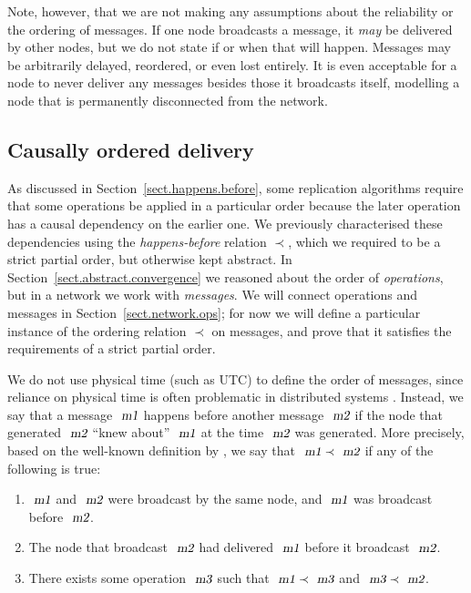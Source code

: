 Note, however, that we are not making any assumptions about the reliability or the ordering of messages.
If one node broadcasts a message, it \emph{may} be delivered by other nodes, but we do not state if or when that will happen.
Messages may be arbitrarily delayed, reordered, or even lost entirely.
It is even acceptable for a node to never deliver any messages besides those it broadcasts itself, modelling a node that is permanently disconnected from the network.

\subsection{Causally ordered delivery}

As discussed in Section~\ref{sect.happens.before}, some replication algorithms require that some operations be applied in a particular order because the later operation has a causal dependency on the earlier one.
We previously characterised these dependencies using the \emph{happens-before} relation $\prec$, which we required to be a strict partial order, but otherwise kept abstract.
In Section~\ref{sect.abstract.convergence} we reasoned about the order of \emph{operations}, but in a network we work with \emph{messages}.
We will connect operations and messages in Section~\ref{sect.network.ops}; for now we will define a particular instance of the ordering relation $\prec$ on messages, and prove that it satisfies the requirements of a strict partial order.

We do not use physical time (such as UTC) to define the order of messages, since reliance on physical time is often problematic in distributed systems \cite{Sheehy:2015jm}.
Instead, we say that a message $\isa{m1}$ happens before another message $\isa{m2}$ if the node that generated $\isa{m2}$ ``knew about'' $\isa{m1}$ at the time $\isa{m2}$ was generated.
More precisely, based on the well-known definition by \citet{Lamport:1978jq}, we say that $\isa{m1}\prec\isa{m2}$ if any of the following is true:
\begin{enumerate}
\item $\isa{m1}$ and $\isa{m2}$ were broadcast by the same node, and $\isa{m1}$ was broadcast before $\isa{m2}$.
\item The node that broadcast $\isa{m2}$ had delivered $\isa{m1}$ before it broadcast $\isa{m2}$.
\item There exists some operation $\isa{m3}$ such that $\isa{m1} \prec \isa{m3}$ and $\isa{m3} \prec \isa{m2}$.
\end{enumerate}


